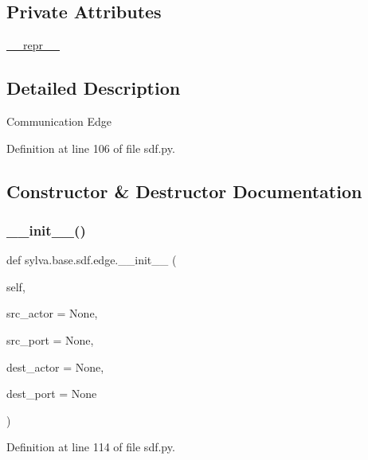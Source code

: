 \subsection*{Private Attributes}
\begin{DoxyCompactItemize}
\item 
\hyperlink{classsylva_1_1base_1_1sdf_1_1edge_a03f8f78d19556dff84516cb339a98013}{\+\_\+\+\_\+repr\+\_\+\+\_\+}
\end{DoxyCompactItemize}


\subsection{Detailed Description}
\begin{DoxyVerb}  Communication Edge
\end{DoxyVerb}
 

Definition at line 106 of file sdf.\+py.



\subsection{Constructor \& Destructor Documentation}
\mbox{\label{classsylva_1_1base_1_1sdf_1_1edge_a6a95fa703d840fda3211f4b254958611}} 
\subsubsection{\texorpdfstring{\+\_\+\+\_\+init\+\_\+\+\_\+()}{\_\_init\_\_()}}
{\footnotesize\ttfamily def sylva.\+base.\+sdf.\+edge.\+\_\+\+\_\+init\+\_\+\+\_\+ (\begin{DoxyParamCaption}\item[{}]{self,  }\item[{}]{src\+\_\+actor = {\ttfamily None},  }\item[{}]{src\+\_\+port = {\ttfamily None},  }\item[{}]{dest\+\_\+actor = {\ttfamily None},  }\item[{}]{dest\+\_\+port = {\ttfamily None} }\end{DoxyParamCaption})}



Definition at line 114 of file sdf.\+py.


